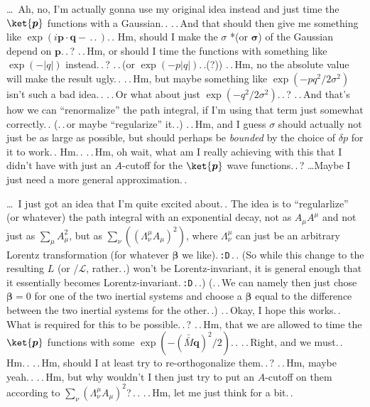 \documentclass{report}
\begin{document}
\ldots\ Ah, no, I'm actually gonna use my original idea instead and just time the $\ket{\boldsymbol{p}}$ functions with a Gaussian.\,. .\,.\,And that should then give me something like $\exp(i \boldsymbol{p} \cdot \boldsymbol{q} - \,.\,.\,)$.\,. Hm, should I make the $\sigma$ *(or $\boldsymbol{\sigma}$) of the Gaussian depend on $\boldsymbol{p}$.\,.\,? .\,.\,Hm, or should I time the functions with something like $\exp(-|q|)$ instead.\,.\,? .\,.\,(or $\exp(-p |q|)$.\,.(?)) .\,.\,Hm, no the absolute value will make the result ugly.\,. .\,.\,Hm, but maybe something like $\exp(-p q^2/2\sigma^2)$ isn't such a bad idea.\,. .\,.\,Or what about just $\exp(-q^2/2\sigma^2)$.\,.\,? .\,.\,And that's how we can ``renormalize'' the path integral, if I'm using that term just somewhat correctly.\,. (.\,.\,or maybe ``regularize'' it.\,.) .\,.\,Hm, and I guess $\sigma$ should actually not just be as large as possible, but should perhaps be \emph{bounded} by the choice of $\delta p$ for it to work.\,. Hm.\,. .\,.\,Hm, oh wait, what am I really achieving with this that I didn't have with just an $A$-cutoff for the $\ket{\boldsymbol{p}}$ wave functions.\,.\,? %
\ldots Maybe I just need a more general approximation.\,. 

\ldots\ I just got an idea that I'm quite excited about.\,. The idea is to ``regularlize'' (or whatever) the path integral with an exponential decay, not as $A_\mu A^\mu$ and not just as $\sum_\mu A_\mu^2$, but as $\sum_\nu ((\Lambda_\nu^\mu A_\mu)^2)$, where $\Lambda_\nu^\mu$ can just be an arbitrary Lorentz transformation (for whatever $\boldsymbol{\beta}$ we like).\,\texttt{:D}\,.\,. (So while this change to the resulting $L$ (or /$\mathcal{L}$, rather.\,.) won't be Lorentz-invariant, it is general enough that it essentially becomes Lorentz-invariant.\,\texttt{:D}\,.\,.) (.\,.\,We can namely then just chose $\boldsymbol{\beta}=0$ for one of the two inertial systems and choose a $\boldsymbol{\beta}$ equal to the difference between the two inertial systems for the other.\,.) .\,.\,Okay, I hope this works.\,. What is required for this to be possible.\,.\,? .\,.\,Hm, that we are allowed to time the $\ket{\boldsymbol p}$ functions with some $\exp(-(\bar{\bar M} \boldsymbol{q})^2/2)$.\,. .\,.\,Right, and we must.\,. Hm.\,. .\,.\,Hm, should I at least try to re-orthogonalize them.\,.\,? .\,.\,Hm, maybe yeah.\,. .\,.\,Hm, but why wouldn't I then just try to put an $A$-cutoff on them according to $\sum_\nu (\Lambda_\nu^\mu A_\mu)^2$?\,.\,. .\,.\,Hm, let me just think for a bit.\,. %
\end{document}
